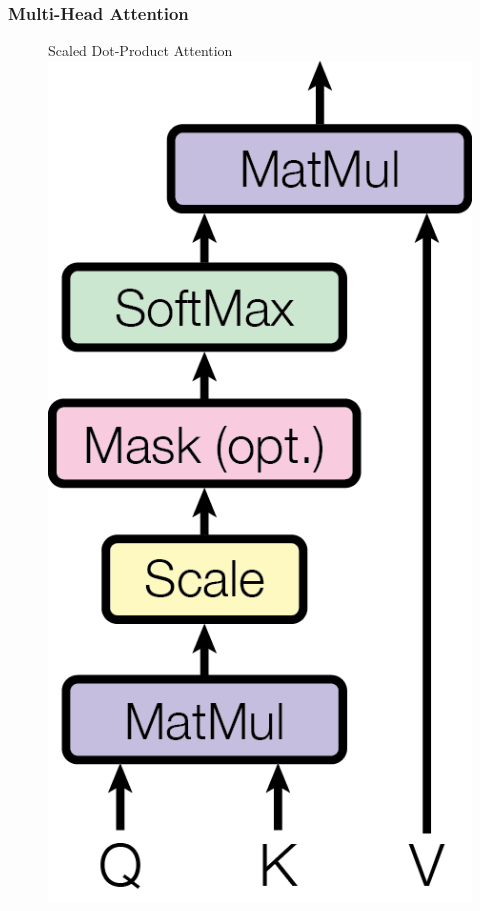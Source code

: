 \documentclass{article}
\begin{document}
\subsubsection{Multi-Head Attention} \label{sec:multihead}

\begin{figure}
\begin{minipage}[t]{0.5\textwidth}
  \centering
  Scaled Dot-Product Attention \\
  \vspace{0.5cm}
  \includegraphics[scale=0.6]{Figures/ModalNet-19}

\end{minipage}
\end{figure}
\end{document}
